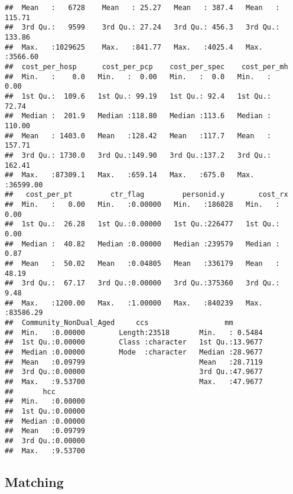 \documentclass[]{article}
\begin{document}
\begin{verbatim}
##  Mean   :   6728    Mean   : 25.27   Mean   : 387.4   Mean   : 115.71  
##  3rd Qu.:   9599    3rd Qu.: 27.24   3rd Qu.: 456.3   3rd Qu.: 133.86  
##  Max.   :1029625    Max.   :841.77   Max.   :4025.4   Max.   :3566.60  
##  cost_per_hosp      cost_per_pcp    cost_per_spec    cost_per_mh      
##  Min.   :    0.0   Min.   :  0.00   Min.   :  0.0   Min.   :    0.00  
##  1st Qu.:  109.6   1st Qu.: 99.19   1st Qu.: 92.4   1st Qu.:   72.74  
##  Median :  201.9   Median :118.80   Median :113.6   Median :  110.00  
##  Mean   : 1403.0   Mean   :128.42   Mean   :117.7   Mean   :  157.71  
##  3rd Qu.: 1730.0   3rd Qu.:149.90   3rd Qu.:137.2   3rd Qu.:  162.41  
##  Max.   :87309.1   Max.   :659.14   Max.   :675.0   Max.   :36599.00  
##   cost_per_pt         ctr_flag         personid.y        cost_rx        
##  Min.   :   0.00   Min.   :0.00000   Min.   :186028   Min.   :    0.00  
##  1st Qu.:  26.28   1st Qu.:0.00000   1st Qu.:226477   1st Qu.:    0.00  
##  Median :  40.82   Median :0.00000   Median :239579   Median :    0.87  
##  Mean   :  50.02   Mean   :0.04805   Mean   :336179   Mean   :   48.19  
##  3rd Qu.:  67.17   3rd Qu.:0.00000   3rd Qu.:375360   3rd Qu.:    9.48  
##  Max.   :1200.00   Max.   :1.00000   Max.   :840239   Max.   :83586.29  
##  Community_NonDual_Aged     ccs                  mm         
##  Min.   :0.00000        Length:23518       Min.   : 0.5484  
##  1st Qu.:0.00000        Class :character   1st Qu.:13.9677  
##  Median :0.00000        Mode  :character   Median :28.9677  
##  Mean   :0.09799                           Mean   :28.7119  
##  3rd Qu.:0.00000                           3rd Qu.:47.9677  
##  Max.   :9.53700                           Max.   :47.9677  
##       hcc         
##  Min.   :0.00000  
##  1st Qu.:0.00000  
##  Median :0.00000  
##  Mean   :0.09799  
##  3rd Qu.:0.00000  
##  Max.   :9.53700
\end{verbatim}

\subsection{Matching}\label{matching}
\end{document}
